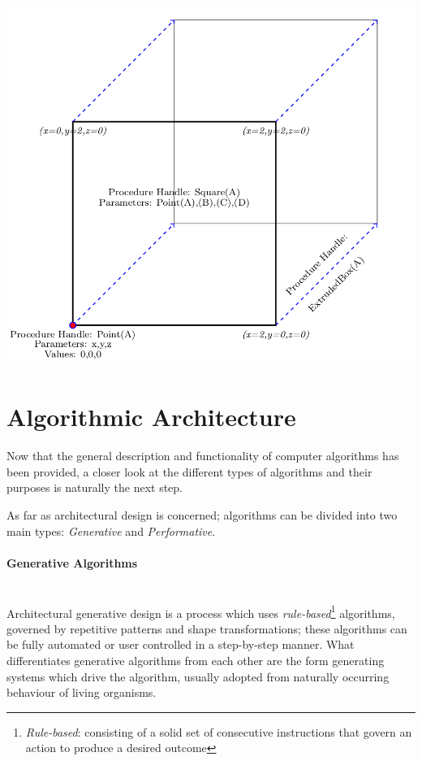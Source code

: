 \documentclass[11pt,a4paper,oneside]{article}
\newenvironment{Figure}		%
	{\par\medskip\noindent\minipage{\linewidth}}
	{\endminipage\par\medskip}
\begin{document}
\begin{multicols}{2}
\begin{Figure}
	\includegraphics[width=\linewidth]{./Images/1-Box}
	\label{fig:Box}
\end{Figure}

\section{Algorithmic Architecture}

Now that the general description and functionality of computer algorithms has been provided, a closer look at the different types of algorithms and their purposes is naturally the next step.

As far as architectural design is concerned; algorithms can be divided into two main types: \emph{Generative} and \emph{Performative}. \cite{fasoulaki08}

\paragraph{Generative Algorithms}\mbox{}\\[3mm]
Architectural generative design is a process which uses \emph{rule-based}\footnote{\emph{Rule-based}: consisting of a solid set of consecutive instructions that govern an action to produce a desired outcome} algorithms, governed by repetitive patterns and shape transformations; these algorithms can be fully automated or user controlled in a step-by-step manner. What differentiates generative algorithms from each other are the form generating systems which drive the algorithm, usually adopted from naturally occurring behaviour of living organisms. \cite{arida04}


\end{multicols}
\end{document}
